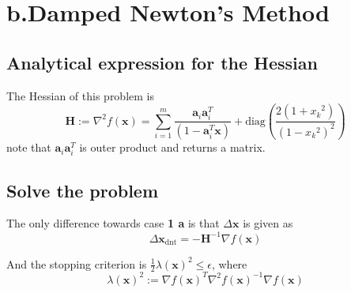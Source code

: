 \documentclass[]{article}
\begin{document}
\section{b.Damped Newton's Method}
\subsection{Analytical expression for the Hessian}
The Hessian of this problem is $$\textbf{H}:=\nabla^2 f(\textbf{x}) = \sum_{i=1}^{m}\frac{\textbf{a}_i\textbf{a}_i^T}{(1-\textbf{a}_i^T\textbf{x})}+\mathrm{diag}\left(\frac{2(1+x_k\phantom{}^2)}{(1-x_k\phantom{}^2)^2}\right)$$ note that $\textbf{a}_i\textbf{a}_i^T$ is outer product and returns a matrix.
\subsection{Solve the problem}
The only difference towards case \textbf{1 a} is that $\Delta \textbf{x}$ is given as 
$$\Delta \textbf{x}_{\mathrm{dnt}} =  -\textbf{H}^{-1}\nabla f(\textbf{x})$$
\par And the stopping criterion is $\frac{1}{2}\lambda{(\mathbf{x})}^2\le \epsilon$, where
$$\lambda{(\mathbf{x})}^2 := \nabla f(\textbf{x})^T\nabla^2 f(\textbf{x})^{-1}\nabla f(\textbf{x})$$
\end{document}

